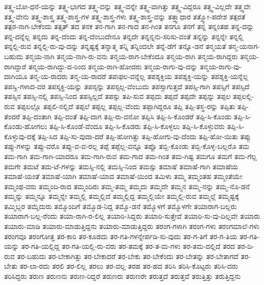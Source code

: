 {ತತ್ತ್ವ-ಬೋ-ಧನೆ-ಯನ್ನು
ತತ್ತ್ವ-ಭಾಗದ
ತತ್ತ್ವ-ವನ್ನು
ತತ್ತ್ವ-ವನ್ನೇ
ತತ್ತ್ವ-ವಾಗಿತ್ತು
ತತ್ತ್ವ-ವಿದ್ದರೂ
ತತ್ತ್ವ-ವಿಲ್ಲದೇ
ತತ್ತ್ವವೇ
ತತ್ತ್ವ-ವೇನು
ತತ್ತ್ವ-ಶಾಸ್ತ್ರ
ತತ್ತ್ವ-ಶಾಸ್ತ್ರ-ಗಳ
ತತ್ತ್ವ-ಶಾಸ್ತ್ರ-ಗಳು
ತತ್ತ್ವ-ಶಾಸ್ತ್ರ-ವನ್ನು
ತತ್ತ್ವಾಧಾರ
ತತ್ತ್ವೋ-ಪದೇಶ
ತತ್ಪರತೆ
ತತ್ಪರ-ನಾಗ-ಬೇಕೆಂದು
ತತ್ಸತ್
ತದ
ತನಕ
ತನ-ಗಾಗಿ
ತನ-ಗಾದ
ತನ-ಗಿಂತ
ತನಗೂ
ತನಗೆ
ತನ್ನ
ತನ್ನಂತಹ
ತನ್ನ-ದನ್ನು
ತನ್ನ-ದನ್ನೆಲ್ಲ
ತನ್ನದು
ತನ್ನ-ದೆಂದು
ತನ್ನ-ದೆಂಬುದೇನೂ
ತನ್ನದೇ
ತನ್ನನ್ನನು-ಸರಿಸು-ವಂತೆ
ತನ್ನನ್ನು
ತನ್ನನ್ನೇ
ತನ್ನಲ್ಲಿ
ತನ್ನಲ್ಲಿ-ರುವ
ತನ್ನಲ್ಲಿ-ರು-ವು-ದನ್ನು
ತನ್ನಷ್ಟಕ್ಕೆ
ತನ್ನಾತ್ಮ
ತನ್ನಿ
ತನ್ನಿಂದಲೇ
ತನ್ನೆ-ಡೆಗೆ
ತನ್ನೊ-ಡನೆ
ತನ್ಮಯತೆ
ತನ್ಮ-ಯನಾಗ-ಬಹುದು
ತನ್ಮಯ-ನಾಗಿ
ತನ್ಮಯ-ನಾಗಿ-ರು-ವನು
ತನ್ಮಯ-ರಾಗ-ಬೇಕೆಂದೂ
ತನ್ಮಯ-ರಾಗಿ
ತನ್ಮಯ-ರಾಗಿದ್ದರು
ತನ್ಮಯ-ರಾಗಿದ್ದಾರೆ
ತನ್ಮಯ-ರಾಗಿದ್ದು-ದ-ರಿಂದ
ತನ್ಮಯ-ರಾಗಿ-ಹೋದರು
ತನ್ಮಯ-ರಾಗು-ವು-ದನ್ನು
ತನ್ಮಯ-ರಾಗು-ವು-ದಾಗಿಯೂ
ತನ್ಮ-ಯ-ರಾದರು
ತನ್ಮ-ಯ-ರಾದರೆ
ತಪಃಫಲ-ವನ್ನೆಲ್ಲ
ತಪಶ್ಶಕ್ತಿಯ
ತಪಶ್ಶಕ್ತಿ-ಯನ್ನು
ತಪಶ್ಶಕ್ತಿ-ಯನ್ನೆಲ್ಲ
ತಪಸ್ವಿ-ಗಳಾದ-ವರ
ತಪಸ್ಶಕ್ತಿ-ಯನ್ನು
ತಪಸ್ಸನ್ನು
ತಪಸ್ಸಲ್ಲ-ವೆಂಬುದು
ತಪಸ್ಸಾಗುತ್ತದೆ
ತಪಸ್ಸಿ-ಗಾಗಿ
ತಪಸ್ಸಿಗೆ
ತಪಸ್ಸಿದೆ
ತಪಸ್ಸಿನ
ತಪಸ್ಸಿ-ನಲ್ಲಿ
ತಪಸ್ಸಿ-ನಿಂದ
ತಪಸ್ಸಿಲ್ಲದೆ
ತಪಸ್ಸು
ತಪಿ-ಸುವ
ತಪ್ಪದು
ತಪ್ಪದೆ
ತಪ್ಪದೇ
ತಪ್ಪನ್ನು
ತಪ್ಪಲ
ತಪ್ಪಲಲ್ಲಿ-ರುವ
ತಪ್ಪಲಲ್ಲೊ
ತಪ್ಪಲಿ-ನಲ್ಲಿದೆ
ತಪ್ಪಲೆ
ತಪ್ಪಲ್ಲ
ತಪ್ಪಲ್ಲ-ವೆಂದು
ತಪ್ಪಾಗಿದ್ದರೂ
ತಪ್ಪಿ
ತಪ್ಪಿ-ತಸ್ಥ-ರನ್ನು
ತಪ್ಪಿತು
ತಪ್ಪಿ-ತೆಂದರೆ
ತಪ್ಪಿ-ದಂತಾಗಿ
ತಪ್ಪಿ-ದಂತೆ
ತಪ್ಪಿ-ದಾಗ
ತಪ್ಪಿ-ರು-ವನೋ
ತಪ್ಪಿಸಿ
ತಪ್ಪಿ-ಸಿ-ಕೊಂಡರೆ
ತಪ್ಪಿ-ಸಿ-ಕೊಂಡು
ತಪ್ಪಿ-ಸಿ-ಕೊಂಡು-ಹೋಗಲು
ತಪ್ಪಿ-ಸಿ-ಕೊಂಡೆ-ವೆಂದೂ
ತಪ್ಪಿ-ಸಿ-ಕೊಡರು
ತಪ್ಪಿ-ಸಿ-ಕೊಳ್ಳಲು
ತಪ್ಪಿ-ಸಿ-ಕೊಳ್ಳುವರು
ತಪ್ಪಿ-ಸಿ-ಕೊಳ್ಳುವು-ದಕ್ಕೆ
ತಪ್ಪಿ-ಸಿದ
ತಪ್ಪಿ-ಸು-ವುದಾ-ದರೆ
ತಪ್ಪಿ-ಹೋಗಿತ್ತು
ತಪ್ಪಿ-ಹೋಗು-ವು-ದೆಂದು
ತಪ್ಪಿ-ಹೋ-ಯಿತು
ತಪ್ಪು
ತಪ್ಪು-ಗಳನ್ನು
ತಪ್ಪು-ವರೊ
ತಪ್ಪು-ವ-ವ-ರಲ್ಲ
ತಪ್ಪೆ
ತಪ್ಪೆಲ್ಲ-ವನ್ನೂ
ತಪ್ಪೊ
ತಬ್ಬಿ-ಕೊಂಡು
ತಬ್ಬಿ-ಕೊಳ್ಳ-ಬಲ್ಲರೊ
ತಮ
ತಮ-ಗಾಗಿ
ತಮ-ಗಾಗಿ-ಯಾದರೂ
ತಮ-ಗಾಗಿ-ರುವ
ತಮ-ಗಾದ
ತಮ-ಗಿಂತ
ತಮ-ಗಿಷ್ಟ
ತಮಗೂ
ತಮಗೆ
ತಮ-ಗೆಲ್ಲ
ತಮಗೇ
ತಮಟೆ
ತಮ-ಟೆ-ಗಳನ್ನು
ತಮಸ್ಸಿ-ನಲ್ಲಿ
ತಮಸ್ಸಿ-ನಿಂದ
ತಮಸ್ಸು
ತಮಾಷೆ
ತಮಾಷೆ-ಗಾಗಿ
ತಮಾಷೆಯ
ತಮಾಷೆ-ಯಂತೆ
ತಮಾಷೆ-ಯಾಗಿ
ತಮಾಷೆ-ಯಾದ
ತಮಾಷೆ-ಯಿಂದ
ತಮಿಳು
ತಮ್ಮ
ತಮ್ಮಂತಹ
ತಮ್ಮಂತೆಯೇ
ತಮ್ಮಂಥ-ವರು
ತಮ್ಮಂದಿ-ರಾದ
ತಮ್ಮಂದಿರು
ತಮ್ಮ-ತಮ್ಮ
ತಮ್ಮದು
ತಮ್ಮದೇ
ತಮ್ಮನ
ತಮ್ಮ-ನನ್ನು
ತಮ್ಮ-ನೊ-ಡನೆ
ತಮ್ಮನ್ನು
ತಮ್ಮನ್ನೂ
ತಮ್ಮನ್ನೇ
ತಮ್ಮಲ್ಲಿ
ತಮ್ಮಲ್ಲಿದೆ
ತಮ್ಮಲ್ಲಿದ್ದ
ತಮ್ಮಲ್ಲಿಯೇ
ತಮ್ಮಲ್ಲಿ-ರುವ
ತಮ್ಮಲ್ಲೆ
ತಮ್ಮಷ್ಟಕ್ಕೆ
ತಮ್ಮಿಬ್ಬರ
ತಮ್ಮೆದುರು
ತಮ್ಮೊಂದಿಗೆ
ತಮ್ಮೊಡ-ನಿದ್ದ
ತಮ್ಮೊ-ಡನೆ
ತಮ್ಮೊಳಗೆ
ತಮ್ಮೊಳಗೇ
ತಯಾರಾಗ-ಬಲ್ಲರು
ತಯಾರಾಗ-ಬಲ್ಲ-ರೆಂದು
ತಯಾ-ರಾಗಿ-ರ-ಲಿಲ್ಲ
ತಯಾರಿ-ಸಿದ್ದರು
ತಯಾರಿ-ಸುತ್ತೇವೆ
ತಯಾರಿ-ಸು-ವು-ದಿಲ್ಲವೇ
ತಯಾರು
ತಯಾರು-ಮಾಡಿ
ತಯಾರು-ಮಾಡುತ್ತಿದ್ದನು
ತಯಾರು-ಮಾಡುತ್ತಿದ್ದರು
ತರಂಗ-ಗಳಾಗಿ
ತರಂಗ-ಗಳು
ತರಂಗಮಾಲೆ-ಗಳು
ತರಂಗವೂ
ತರಂಗೋತ್ತ
ತರ-ಕಾರಿ
ತರ-ಕೂಡದು
ತರ-ಗತಿ-ಗಳನ್ನೇರ್ಪಡಿ-ಸು-ವುದು
ತರ-ಗ-ತಿಗೆ
ತರ-ಗ-ತಿಯ
ತರ-ಗತಿ-ಯನ್ನು
ತರ-ಗತಿ-ಯಲ್ಲಿದ್ದ
ತರ-ಗತಿ-ಯಲ್ಲಿ-ರು-ವರು
ತರ-ತಮಕ್ಕೆ
ತರ-ತ-ಮ-ಗಳು
ತರ-ತಮ-ದಲ್ಲಿದೆ
ತರದ
ತರ-ದಿ-ರುವ
ತರ-ಬಹುದು
ತರ-ಬೇಕಾಗಿತ್ತು
ತರ-ಬೇಕಾದರೆ
ತರ-ಬೇಕು
ತರ-ಬೇಕೆಂದು
ತರ-ಬೇತನ್ನು
ತರ-ಬೇತಾಗದೆ
ತರ-ಬೇತು
ತರ-ಲಾ-ರದು
ತರಲಿ
ತರ-ಲಿಲ್ಲ
ತರಲು
ತರ-ವಲ್ಲ
ತರಹ
ತರ-ಹದ
ತರಿಸಿ
ತರಿಸಿ-ಕೊಟ್ಟರು
ತರಿಸಿ-ದರು
ತರಿಸಿದ್ದರು
ತರುಣ
ತರುಣನು
ತರುಣ-ರಿದ್ದರೆ
ತರುಣರು
ತರುಣರೇ
ತರುತ್ತದೆ
ತರುತ್ತವೆ
ತರುತ್ತಿತ್ತು
ತರುತ್ತಿದ್ದನು
}
